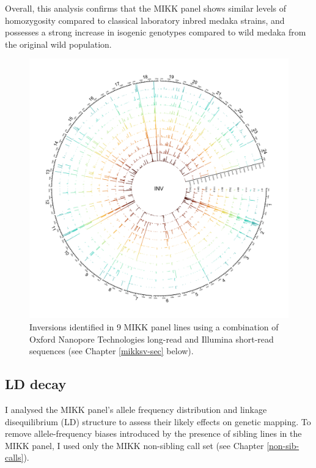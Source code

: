 \documentclass[
]{book}
\begin{document}
Overall, this analysis confirms that the MIKK panel shows similar levels of homozygosity compared to classical laboratory inbred medaka strains, and possesses a strong increase in isogenic genotypes compared to wild medaka from the original wild population.



\begin{figure}
\includegraphics[width=1\linewidth]{figs/mikk_genome/20210224_sv_invs_lines} \caption{Inversions identified in 9 MIKK panel lines using a combination of Oxford Nanopore Technologies long-read and Illumina short-read sequences (see Chapter \ref{mikksv-sec} below).}\label{fig:SVInvs}
\end{figure}

\hypertarget{ld-decay-sec}{%
\subsection{LD decay}\label{ld-decay-sec}}

I analysed the MIKK panel's allele frequency distribution and linkage disequilibrium (LD) structure to assess their likely effects on genetic mapping. To remove allele-frequency biases introduced by the presence of sibling lines in the MIKK panel, I used only the MIKK non-sibling call set (see Chapter \ref{non-sib-calls}).
\end{document}
